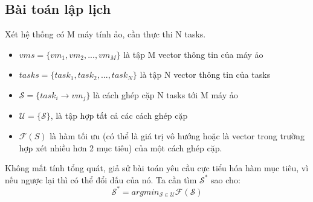 \documentclass{my_style}
\begin{document}
\subsection*{Bài toán lập lịch}
Xét hệ thống có M máy tính ảo, cần thực thi N tasks.
\begin{itemize}
	\item $vms = \{vm_{1}, vm_{2}, ..., vm_{M}\}$ là tập M vector thông tin của máy ảo
	\item $tasks = \{task_{1}, task_{2}, ..., task_{N}\}$ là tập N vector thông tin của tasks
	\item $\mathcal{S} = \{task_{i} \rightarrow vm_{j}\}$ là cách ghép cặp N tasks tới M máy ảo
	\item $\mathcal{U} = \{\mathcal{S}\}$, là tập hợp tất cả các cách ghép cặp
	\item $\mathcal{F}(S)$ là hàm tối ưu (có thể là giá trị vô hướng hoặc là vector trong trường hợp xét nhiều hơn 2 mục tiêu) của một cách ghép cặp.
\end{itemize}
Không mất tính tổng quát, giả sử bài toán yêu cầu cực tiểu hóa hàm mục tiêu, vì nếu ngược lại thì có thể đổi dấu của nó. Ta cần tìm $\mathcal{S^{*}}$ sao cho: 
\begin{equation*}
	\mathcal{S^{*}} = argmin_{\mathcal{S} \in \mathcal{U}}\mathcal{F}(\mathcal{S})
\end{equation*}
\end{document}
